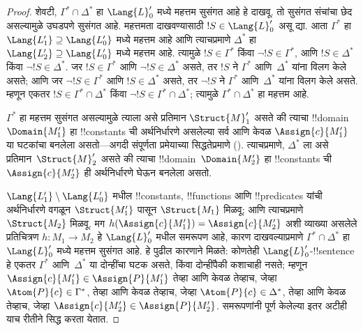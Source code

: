 \documentclass[../../../include/open-logic-section]{subfiles}
\begin{document}
\begin{proof}
शेवटी, $\Gamma^* \cap \Delta^*$ हा $\Lang{L}'_0$ मध्ये महत्तम सुसंगत
आहे हे दाखवू. तो सुसंगत संचांचा छेद असल्यामुळे उघडपणे सुसंगत आहे. महत्तमता
दाखवण्यासाठी $!S \in \Lang{L}'_0$ असू द्या. आता $\Gamma^*$ हा
$\Lang{L'_1} \supseteq \Lang{L'_0}$ मध्ये महत्तम आहे आणि त्याचप्रमाणे
$\Delta^*$ हा $\Lang{L'_2} \supseteq \Lang{L'_0}$ मध्ये महत्तम आहे.
त्यामुळे $!S \in \Gamma^*$ किंवा $\lnot !S \in \Gamma^*$, आणि
$!S \in \Delta^*$ किंवा $\lnot !S \in \Delta^*$. जर $!S \in
\Gamma^*$ आणि $\lnot !S \in \Delta^*$ असते, तर $!S$ ने $\Gamma^*$
आणि~$\Delta^*$ यांना विलग केले असते; आणि जर $\lnot !S \in \Gamma^*$
आणि $!S \in \Delta^*$ असते, तर $\lnot !S$ ने $\Gamma^*$ आणि~$\Delta^*$
यांना विलग केले असते. म्हणून एकतर $!S \in \Gamma^* \cap \Delta^*$
किंवा $\lnot !S \in \Gamma^* \cap \Delta^*$; त्यामुळे $\Gamma^* \cap
\Delta^*$ हा महत्तम आहे.

$\Gamma^*$ हा महत्तम सुसंगत असल्यामुळे त्याला असे प्रतिमान
$\Struct{M}'_1$ असते की त्याचा !!{domain}~$\Domain{M'_1}$ हा
!!{constant}s ची अर्थनिर्धारणे असलेल्या सर्व आणि केवळ $\Assign{c}{M'_1}$
या घटकांचा बनलेला असतो---अगदी संपूर्णता प्रमेयाच्या सिद्धतेप्रमाणे
(). त्याचप्रमाणे, $\Delta^*$ ला
असे प्रतिमान~$\Struct{M}'_2$ असते की त्याचा !!{domain}~$\Domain{M'_2}$
हा !!{constant}s ची $\Assign{c}{M'_2}$ ही अर्थनिर्धारणे घेऊन बनलेला असतो.

$\Lang{L'_1} \setminus \Lang{L'_0}$ मधील !!{constant}s, !!{function}s
आणि !!{predicate}s यांची अर्थनिर्धारणे वगळून $\Struct{M'_1}$ पासून
$\Struct{M_1}$ मिळवू; आणि त्याचप्रमाणे $\Struct{M_2}$ मिळवू. मग
$h(\Assign{c}{M'_1}) = \Assign{c}{M'_2}$ अशी व्याख्या असलेले प्रतिचित्रण
$h \colon M_1 \to M_2$ हे $\Lang{L}'_0$ मधील समरूपण आहे, कारण दाखवल्याप्रमाणे
$\Gamma^* \cap \Delta^*$ हा $\Lang{L}'_0$ मध्ये महत्तम सुसंगत आहे. हे
पुढील कारणाने मिळते: कोणतेही $\Lang{L}'_0$-!!{sentence} हे एकतर $\Gamma^*$
आणि~$\Delta^*$ या दोन्हींचा घटक असते, किंवा दोन्हींपैकी कशाचाही नसते;
म्हणून $\Assign{c}{M'_1} \in \Assign{P}{M'_1}$ तेव्हा आणि केवळ तेव्हाच,
जेव्हा $\Atom{P}{c} \in \Gamma^*$, तेव्हा आणि केवळ तेव्हाच, जेव्हा
$\Atom{P}{c} \in \Delta^*$, तेव्हा आणि केवळ तेव्हाच, जेव्हा
$\Assign{c}{M'_2} \in \Assign{P}{M'_2}$. समरूपणांनी पूर्ण केलेल्या इतर
अटीही याच रीतीने सिद्ध करता येतात.


\end{proof}
\end{document}
